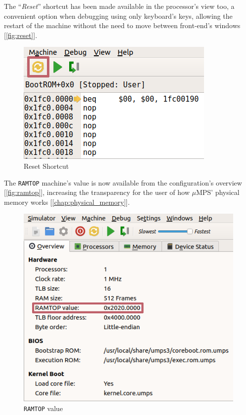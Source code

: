 \documentclass[12pt,a4paper,openright,twoside]{report}
\begin{document}
\clearpage
The ``\textit{Reset}'' shortcut has been made available in the processor's view too, a convenient option when debugging using only keyboard's keys, allowing the restart of the machine without the need to move between front-end's windows [\autoref{fig:reset}].
\begin{figure}[h]
	\centering
	\includegraphics[scale=0.7]{reset}
	\caption{Reset Shortcut}
	\label{fig:reset}
\end{figure}

The \texttt{RAMTOP} machine's value is now available from the configuration's overview [\autoref{fig:ramtop}], increasing the transparency for the user of how $\mu$MPS' physical memory works [\autoref{chap:physical_memory}].
\begin{figure}[h]
	\centering
	\includegraphics[scale=0.72]{ramtop}
	\caption{\texttt{RAMTOP} value}
	\label{fig:ramtop}
\end{figure}
\end{document}
